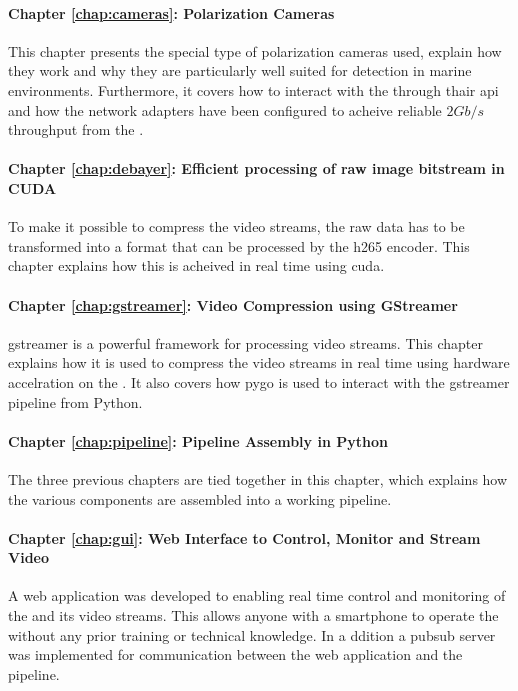 \paragraph{Chapter \ref{chap:cameras}: Polarization Cameras}
This chapter presents the special type of polarization cameras used, explain how they work and why they are particularly well suited for detection in marine environments.
Furthermore, it covers how to interact with the \cams through thair \gls{api} and how the network adapters have been configured to acheive reliable $2Gb/s$ throughput from the \cams.

\paragraph{Chapter \ref{chap:debayer}: Efficient processing of raw image bitstream in CUDA}
To make it possible to compress the video streams, the raw data has to be transformed into a format that can be processed by the \gls{h265} encoder.
This chapter explains how this is acheived in real time using \gls{cuda}.

\paragraph{Chapter \ref{chap:gstreamer}: Video Compression using GStreamer}
\gls{gstreamer} is a powerful framework for processing video streams.
This chapter explains how it is used to compress the video streams in real time using hardware accelration on the \jx.
It also covers how \gls{pygo} is used to interact with the \gls{gstreamer} pipeline from Python.

\paragraph{Chapter \ref{chap:pipeline}: Pipeline Assembly in Python}
The three previous chapters are tied together in this chapter, which explains how the various components are assembled into a working pipeline.

\paragraph{Chapter \ref{chap:gui}: Web Interface to Control, Monitor and Stream Video}
A web application was developed to enabling real time control and monitoring of the \sr and its video streams.
This allows anyone with a smartphone to operate the \sr without any prior training or technical knowledge.
In a ddition a \gls{pubsub} server was implemented for communication between the web application and the pipeline.


